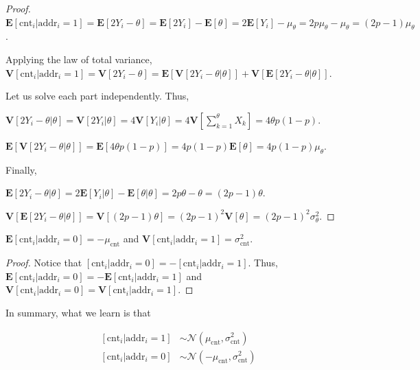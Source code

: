 \begin{proof}

$\mathbf{E}[\text{cnt}_i | \text{addr}_i = 1] = \mathbf{E}[2Y_i - \theta] = \mathbf{E}[2Y_i] - \mathbf{E}[\theta] = 2 \mathbf{E}[Y_i] - \mu_\theta = 2 p \mu_\theta - \mu_\theta = (2p-1) \mu_\theta$.

Applying the law of total variance, $\mathbf{V}[\text{cnt}_i | \text{addr}_i = 1] = \mathbf{V}[2Y_i - \theta] = \mathbf{E}[\mathbf{V}[2Y_i - \theta | \theta]] + \mathbf{V}[\mathbf{E}[2Y_i - \theta | \theta]]$.

Let us solve each part independently. Thus,

$\mathbf{V}[2Y_i - \theta | \theta] = \mathbf{V}[2Y_i | \theta] = 4 \mathbf{V}[Y_i | \theta] = 4 \mathbf{V}[\sum_{k=1}^\theta X_k] = 4 \theta p (1-p)$.

$\mathbf{E}[\mathbf{V}[2Y_i - \theta | \theta]] = \mathbf{E}[4 \theta p (1-p)] = 4p(1-p) \mathbf{E}[\theta] = 4p(1-p) \mu_\theta$.

Finally,

$\mathbf{E}[2Y_i - \theta | \theta] = 2 \mathbf{E}[Y_i | \theta] - \mathbf{E}[\theta | \theta] = 2p \theta - \theta = (2p-1) \theta$.

$\mathbf{V}[\mathbf{E}[2Y_i - \theta | \theta]] = \mathbf{V}[(2p-1) \theta] = (2p-1)^2 \mathbf{V}[\theta] = (2p-1)^2 \sigma^2_\theta$.
\end{proof}

\begin{theorem}
$\mathbf{E}[\text{cnt}_i | \text{addr}_i = 0] = - \mu_{\text{cnt}}$ and $\mathbf{V}[\text{cnt}_i | \text{addr}_i = 1] = \sigma^2_\text{cnt}$.
\end{theorem}
\begin{proof}
Notice that $[\text{cnt}_i | \text{addr}_i = 0] = -[\text{cnt}_i | \text{addr}_i = 1]$. Thus, $\mathbf{E}[\text{cnt}_i | \text{addr}_i = 0] = -\mathbf{E}[\text{cnt}_i | \text{addr}_i = 1]$ and $\mathbf{V}[\text{cnt}_i | \text{addr}_i = 0] = \mathbf{V}[\text{cnt}_i | \text{addr}_i = 1]$.
\end{proof}

In summary, what we learn is that

\begin{align}
\left[ \text{cnt}_i | \text{addr}_i=1 \right] &\sim \mathcal{N}(\mu_\text{cnt}, \sigma^2_\text{cnt})\label{cntaddr1} \\
\left[ \text{cnt}_i | \text{addr}_i=0 \right] &\sim \mathcal{N}(-\mu_\text{cnt}, \sigma^2_\text{cnt})\label{cntaddr0}
\end{align}

